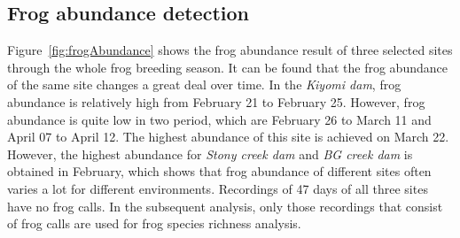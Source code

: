 \subsection{Frog abundance detection}
Figure~\ref{fig:frogAbundance} shows the frog abundance result of three selected sites through the whole frog breeding season. It can be found that the frog abundance of the same site changes a great deal over time. In the \textit{Kiyomi dam}, frog abundance is relatively high from February 21 to February 25. However, frog abundance is quite low in two period, which are February 26 to March 11 and April 07 to April 12. The highest abundance of this site is achieved on March 22. However, the highest abundance for \textit{Stony creek dam} and \textit{BG creek dam} is obtained in February, which shows that frog abundance of different sites often varies a lot for different environments. Recordings of 47 days of all three sites have no frog calls. In the subsequent analysis, only those recordings that consist of frog calls are used for frog species richness analysis. 

